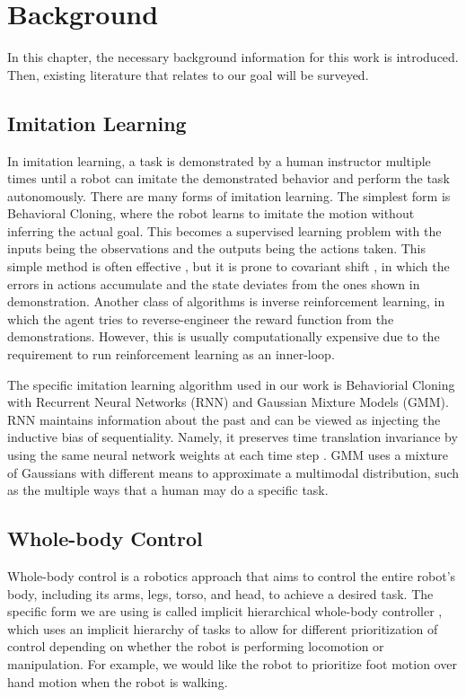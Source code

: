 \chapter{Background}

In this chapter, the necessary background information for this work is introduced. Then, existing literature that relates to our goal will be surveyed.

\section{Imitation Learning}

In imitation learning, a task is demonstrated by a human instructor multiple times until a robot can imitate the demonstrated behavior and perform the task autonomously. 
There are many forms of imitation learning.
The simplest form is Behavioral Cloning, where the robot learns to imitate the motion without inferring the actual goal. This becomes a supervised learning problem with the inputs being the observations and the outputs being the actions taken. This simple method is often effective \cite{zhang2018deep}, but it is prone to covariant shift \cite{ross2011reduction}, in which the errors in actions accumulate and the state deviates from the ones shown in demonstration. 
Another class of algorithms is inverse reinforcement learning, in which the agent tries to reverse-engineer the reward function from the demonstrations. 
However, this is usually computationally expensive due to the requirement to run reinforcement learning as an inner-loop.

The specific imitation learning algorithm used in our work is Behaviorial Cloning with Recurrent Neural Networks (RNN) and Gaussian Mixture Models (GMM). RNN maintains information about the past and can be viewed as injecting the inductive bias of sequentiality. Namely, it preserves time translation invariance by using the same neural network weights at each time step \cite{battaglia2018relational}. GMM uses a mixture of Gaussians with different means to approximate a multimodal distribution, such as the multiple ways that a human may do a specific task.

\section{Whole-body Control}

Whole-body control is a robotics approach that aims to control the entire robot's body, including its arms, legs, torso, and head, to achieve a desired task.
The specific form we are using is called implicit hierarchical whole-body controller \cite{Ahn2021VersatileLP}, which uses an implicit hierarchy of tasks to allow for different prioritization of control depending on whether the robot is performing locomotion or manipulation. For example, we would like the robot to prioritize foot motion over hand motion when the robot is walking.

